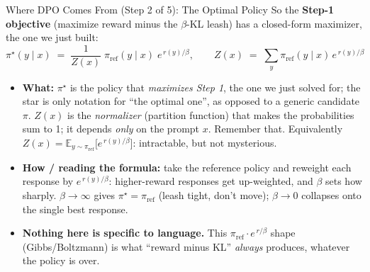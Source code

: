 \begin{frame}{Where DPO Comes From (Step 2 of 5): The Optimal Policy}
So the \textbf{Step-1 objective} (maximize reward minus the $\beta$-KL leash) has a
closed-form maximizer, the one we just built:
\[
    \pi^\star(y\mid x) \;=\; \frac{1}{Z(x)}\;\pi_{\text{ref}}(y\mid x)\;
        e^{\, r(y)/\beta},
    \qquad
    Z(x) \;=\; \sum_{y}\pi_{\text{ref}}(y\mid x)\, e^{\, r(y)/\beta}
\]
\begin{itemize}\itemsep0.3em\small
    \item \textbf{What:} $\pi^\star$ is the policy that \emph{maximizes Step 1}, the
          one we just solved for; the star is only notation for ``the optimal one'',
          as opposed to a generic candidate $\pi$.
          $Z(x)$ is the \emph{normalizer} (partition function) that makes the
          probabilities sum to 1; it depends \emph{only} on the prompt $x$.
          Remember that. Equivalently
          $Z(x)=\mathbb{E}_{y\sim\pi_{\text{ref}}}\big[e^{\,r(y)/\beta}\big]$:
          intractable, but not mysterious.
    \item \textbf{How / reading the formula:} take the reference policy and reweight
          each response by $e^{\, r(y)/\beta}$: higher-reward responses get
          up-weighted, and $\beta$ sets how sharply. $\beta\!\to\!\infty$ gives
          $\pi^\star\!=\!\pi_{\text{ref}}$ (leash tight, don't move);
          $\beta\!\to\!0$ collapses onto the single best response.
    \item \textbf{Nothing here is specific to language.} This $\pi_{\text{ref}}\cdot
          e^{\,r/\beta}$ shape (Gibbs/Boltzmann) is what ``reward minus KL''
          \emph{always} produces, whatever the policy is over.
\end{itemize}
\end{frame}

